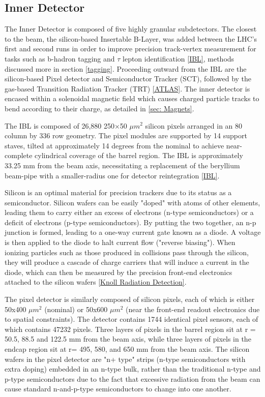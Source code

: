 \subsection{Inner Detector} \label{sec:ID} 

The Inner Detector is composed of five highly granular subdetectors. The closest to the beam, the silicon-based Insertable B-Layer, was added between the LHC's first and second runs in order to improve precision track-vertex measurement for tasks such as b-hadron tagging and \( \tau\) lepton identification \ref{IBL}, methods discussed more in section \ref{tagging}. Proceeding outward from the IBL are the silicon-based Pixel detector and Semiconductor Tracker (SCT), followed by the gas-based Transition Radiation Tracker (TRT) \ref{ATLAS}. The inner detector is encased within a solenoidal magnetic field which causes charged particle tracks to bend according to their charge, as detailed in \ref{sec: Magnets}.

The IBL is composed of 26,880 250×50 \(μm^2\) silicon pixels arranged in an 80 column by 336 row geometry. The pixel modules are supported by 14 support staves, tilted at approximately 14 degrees from the nominal to achieve near-complete cylindrical coverage of the barrel region. The IBL is approximately 33.25 mm from the beam axis, necessitating a replacement of the beryllium beam-pipe with a smaller-radius one for detector reintegration \ref{IBL}.

Silicon is an optimal material for precision trackers due to its status as a semiconductor. Silicon wafers can be easily "doped" with atoms of other elements, leading them to carry either an excess of electrons (n-type semiconductors) or a deficit of electrons (p-type semiconductors). By putting the two together, an n-p junction is formed, leading to a one-way current gate known as a diode. A voltage is then applied to the diode to halt current flow ("reverse biasing"). When ionizing particles such as those produced in collisions pass through the silicon, they will produce a cascade of charge carriers that will induce a current in the diode, which can then be measured by the precision front-end electronics attached to the silicon wafers \ref{Knoll Radiation Detection}.

The pixel detector is similarly composed of silicon pixels, each of which is either 50x400 \(μm^2\) (nominal) or 50x600 \(μm^2\) (near the front-end readout electronics due to spatial constraints). The detector contains 1744 identical pixel sensors, each of which contains 47232 pixels. Three layers of pixels in the barrel region sit at r = 50.5,  88.5 and 122.5 mm from the beam axis, while three layers of pixels in the endcap region sit at r= 495, 580, and 650 mm from the beam axis. The silicon wafers in the pixel detector are "n+ type" strips (n-type semiconductors with extra doping) embedded in an n-type bulk, rather than the traditional n-type and p-type semiconductors due to the fact that excessive radiation from the beam can cause standard n-and-p-type semiconductors to change into one another. 

